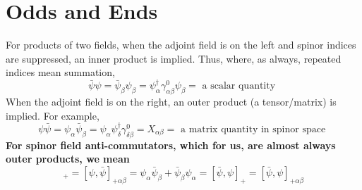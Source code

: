 \section{Odds and Ends}
For products of two fields, when the adjoint field is on the left and spinor indices are suppressed, an inner product is implied. Thus, where, as always, repeated indices mean summation,
\begin{equation}
\bar{\psi} \psi=\bar{\psi}_{\beta} \psi_{\beta}=\psi_{\alpha}^{\dagger} \gamma_{\alpha \beta}^{0} \psi_{\beta}=\text { a scalar quantity }
\end{equation}
When the adjoint field is on the right, an outer product (a tensor/matrix) is implied. For example,
\begin{equation}
\psi \bar{\psi}=\psi_{\alpha} \bar{\psi}_{\beta}=\psi_{\alpha} \psi_{\delta}^{\dagger} \gamma_{\delta \beta}^{0}=X_{\alpha \beta}=\text { a matrix quantity in spinor space }
\end{equation}
\textbf{For spinor field anti-commutators, which for us, are almost always outer products, we mean}
\begin{equation}
[\psi, \bar{\psi}]_{+}=[\psi, \bar{\psi}]_{+\alpha \beta}=\psi_{\alpha} \bar{\psi}_{\beta}+\bar{\psi}_{\beta} \psi_{\alpha}=[\bar{\psi}, \psi]_{+}=[\bar{\psi}, \psi]_{+\alpha \beta}
\end{equation}
